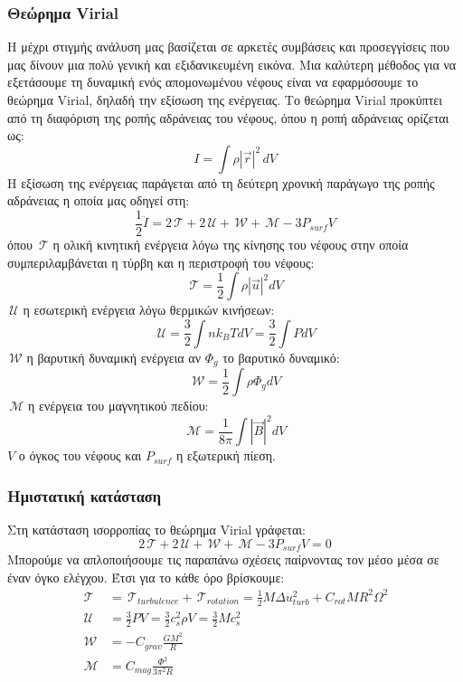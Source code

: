 \documentclass[a4paper,12pt]{memoir}
\newcommand{\TT}{\,\mathcal{T}}
\newcommand{\UU}{\,\mathcal{U}}
\newcommand{\WW}{\,\mathcal{W}}
\newcommand{\MM}{\,\mathcal{M}}
\begin{document}
\subsubsection{Θεώρημα Virial}
Η μέχρι στιγμής ανάλυση μας βασίζεται σε αρκετές συμβάσεις και προσεγγίσεις που μας δίνουν μια πολύ γενική και εξιδανικευμένη εικόνα.
Μια καλύτερη μέθοδος για να εξετάσουμε τη δυναμική ενός απομονωμένου νέφους είναι να εφαρμόσουμε το θεώρημα Virial, δηλαδή την εξίσωση της ενέργειας.
Το θεώρημα Virial προκύπτει από τη διαφόριση της ροπής αδράνειας του νέφους, όπου η ροπή αδράνειας ορίζεται ως: 
\begin{equation}
I=\int \rho |\vec{r}|^2 \, dV
\end{equation}
Η εξίσωση της ενέργειας παράγεται από τη δεύτερη χρονική παράγωγο της ροπής αδράνειας η οποία μας οδηγεί στη:
\begin{equation}
\frac{1}{2}\ddot{I}=2\TT+2\UU +\WW+\MM -3P_{surf}V
\end{equation}
όπου $\TT$ η ολική κινητική ενέργεια λόγω της κίνησης του νέφους στην οποία συμπεριλαμβάνεται η τύρβη και η περιστροφή του νέφους:
\begin{equation}
\TT = \frac{1}{2} \int \rho |\vec{u}|^2 dV
\end{equation}
$\UU$ η εσωτερική ενέργεια λόγω θερμικών κινήσεων:
\begin{equation}
\UU=\frac{3}{2} \int n k_B T dV=\frac{3}{2} \int P dV
\end{equation}
$\WW$ η βαρυτική δυναμική ενέργεια αν $\Phi _g$ το βαρυτικό δυναμικό:
\begin{equation}
\WW=\frac{1}{2} \int \rho \Phi _g dV
\end{equation}
$\MM$ η ενέργεια του μαγνητικού πεδίου:
\begin{equation}
\MM=\frac{1}{8\pi} \int |\vec{B}|^2 dV
\end{equation}
$V$ ο όγκος του νέφους και $P_{surf}$ η εξωτερική πίεση. 
\subsubsection{Ημιστατική κατάσταση}
Στη κατάσταση ισορροπίας το θεώρημα Virial γράφεται:
\begin{equation}
\label{eq:Virial}
2\TT+2\UU +\WW+\MM -3P_{surf}V=0
\end{equation}
Μπορούμε να απλοποιήσουμε τις παραπάνω σχέσεις παίρνοντας τον μέσο μέσα σε έναν όγκο ελέγχου. Έτσι για το κάθε όρο βρίσκουμε:
\begin{align}
\TT &= \TT_{turbulence}+\TT_{rotation} = \frac{1}{2} M \Delta u_{turb} ^2 + C_{rot} M R^2 \Omega ^2\\
\UU &= \frac{3}{2} P V=\frac{3}{2} c_s ^2 \rho V=\frac{3}{2} M c_s ^2 \\
\WW &= -C_{grav} \frac{GM^2}{R} \\
\MM & = C_{mag}\frac{\Phi^2}{3 \pi ^2 R}
\end{align}
\noindent
\end{document}

